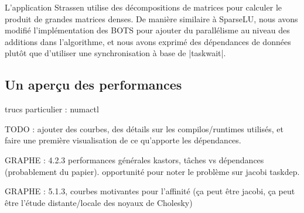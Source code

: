 L'application Strassen utilise des décompositions de matrices pour calculer le produit de grandes matrices denses.
De manière similaire à SparseLU, nous avons modifié l'implémentation des BOTS pour ajouter du parallélisme au niveau des additions dans l'algorithme, et nous avons exprimé des dépendances de données plutôt que d'utiliser une synchronisation à base de |taskwait|.


\subsection{Un aperçu des performances}

trucs particulier : numactl

TODO : ajouter des courbes, des détails sur les compilos/runtimes utilisés, et faire une première visualisation de ce qu'apporte les dépendances.

GRAPHE : 4.2.3 performances générales kastors, tâches vs dépendances (probablement du papier). opportunité pour noter le problème sur jacobi taskdep.

GRAPHE : 5.1.3, courbes motivantes pour l'affinité (ça peut être jacobi, ça peut être l'étude distante/locale des noyaux de Cholesky)
